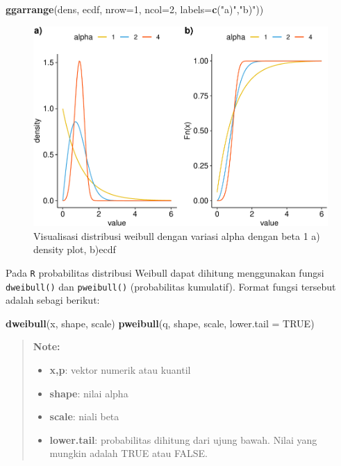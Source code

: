 \documentclass[]{book}
\newenvironment{Shaded}{\begin{snugshade}}{\end{snugshade}}
\newcommand{\KeywordTok}[1]{\textcolor[rgb]{0.13,0.29,0.53}{\textbf{#1}}}
\newcommand{\DataTypeTok}[1]{\textcolor[rgb]{0.13,0.29,0.53}{#1}}
\newcommand{\DecValTok}[1]{\textcolor[rgb]{0.00,0.00,0.81}{#1}}
\newcommand{\StringTok}[1]{\textcolor[rgb]{0.31,0.60,0.02}{#1}}
\newcommand{\OtherTok}[1]{\textcolor[rgb]{0.56,0.35,0.01}{#1}}
\newcommand{\NormalTok}[1]{#1}
\providecommand{\tightlist}{%
  \setlength{\itemsep}{0pt}\setlength{\parskip}{0pt}}
\begin{document}
\begin{Shaded}
\begin{Highlighting}[]
\KeywordTok{ggarrange}\NormalTok{(dens, ecdf, }\DataTypeTok{nrow=}\DecValTok{1}\NormalTok{, }\DataTypeTok{ncol=}\DecValTok{2}\NormalTok{, }\DataTypeTok{labels=}\KeywordTok{c}\NormalTok{(}\StringTok{"a)"}\NormalTok{,}\StringTok{"b)"}\NormalTok{))}
\end{Highlighting}
\end{Shaded}

\begin{figure}

{\centering \includegraphics[width=0.9\linewidth]{EnvStat_files/figure-latex/weibullvis-1} 

}

\caption{Visualisasi distribusi weibull dengan variasi alpha dengan beta 1 a) density plot, b)ecdf}\label{fig:weibullvis}
\end{figure}

Pada \texttt{R} probabilitas distribusi Weibull dapat dihitung
menggunakan fungsi \texttt{dweibull()} dan \texttt{pweibull()}
(probabilitas kumulatif). Format fungsi tersebut adalah sebagi berikut:

\begin{Shaded}
\begin{Highlighting}[]
\KeywordTok{dweibull}\NormalTok{(x, shape, scale)}
\KeywordTok{pweibull}\NormalTok{(q, shape, scale, }\DataTypeTok{lower.tail =} \OtherTok{TRUE}\NormalTok{)}
\end{Highlighting}
\end{Shaded}

\begin{quote}
\textbf{Note: }

\begin{itemize}
\tightlist
\item
  \textbf{x,p}: vektor numerik atau kuantil
\item
  \textbf{shape}: nilai alpha
\item
  \textbf{scale}: niali beta
\item
  \textbf{lower.tail}: probabilitas dihitung dari ujung bawah. Nilai
  yang mungkin adalah TRUE atau FALSE.
\end{itemize}
\end{quote}
\end{document}
